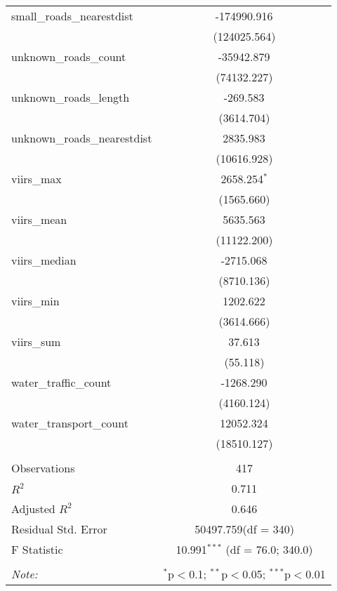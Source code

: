 \begin{table}[!htbp]
\begin{tabular}{@{\extracolsep{5pt}}lc}
 small_roads_nearestdist & -174990.916$^{}$ \\
  & (124025.564) \\
 unknown_roads_count & -35942.879$^{}$ \\
  & (74132.227) \\
 unknown_roads_length & -269.583$^{}$ \\
  & (3614.704) \\
 unknown_roads_nearestdist & 2835.983$^{}$ \\
  & (10616.928) \\
 viirs_max & 2658.254$^{*}$ \\
  & (1565.660) \\
 viirs_mean & 5635.563$^{}$ \\
  & (11122.200) \\
 viirs_median & -2715.068$^{}$ \\
  & (8710.136) \\
 viirs_min & 1202.622$^{}$ \\
  & (3614.666) \\
 viirs_sum & 37.613$^{}$ \\
  & (55.118) \\
 water_traffic_count & -1268.290$^{}$ \\
  & (4160.124) \\
 water_transport_count & 12052.324$^{}$ \\
  & (18510.127) \\
\hline \\[-1.8ex]
 Observations & 417 \\
 $R^2$ & 0.711 \\
 Adjusted $R^2$ & 0.646 \\
 Residual Std. Error & 50497.759(df = 340)  \\
 F Statistic & 10.991$^{***}$ (df = 76.0; 340.0) \\
\hline
\hline \\[-1.8ex]
\textit{Note:} & \multicolumn{1}{r}{$^{*}$p$<$0.1; $^{**}$p$<$0.05; $^{***}$p$<$0.01} \\
\end{tabular}
\end{table}